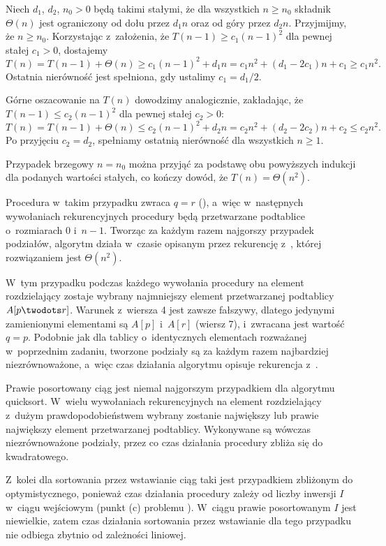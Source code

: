
\exercise %
Niech $d_1$, $d_2$, $n_0>0$ będą takimi stałymi, że dla wszystkich $n\ge n_0$ składnik $\Theta(n)$ jest ograniczony od dołu przez $d_1n$ oraz od góry przez $d_2n$.
Przyjmijmy, że $n\ge n_0$.
Korzystając z~założenia, że $T(n-1)\ge c_1(n-1)^2$ dla pewnej stałej $c_1>0$, dostajemy
\[
	T(n) = T(n-1)+\Theta(n) \ge c_1(n-1)^2+d_1n = c_1n^2+(d_1-2c_1)n+c_1 \ge c_1n^2.
\]
Ostatnia nierówność jest spełniona, gdy ustalimy $c_1=d_1/2$.

Górne oszacowanie na $T(n)$ dowodzimy analogicznie, zakładając, że $T(n-1)\le c_2(n-1)^2$ dla pewnej stałej $c_2>0$:
\[
	T(n) = T(n-1)+\Theta(n) \le c_2(n-1)^2+d_2n = c_2n^2+(d_2-2c_2)n+c_2 \le c_2n^2.
\]
Po przyjęciu $c_2=d_2$, spełniamy ostatnią nierówność dla wszystkich $n\ge1$.

Przypadek brzegowy $n=n_0$ można przyjąć za podstawę obu powyższych indukcji dla podanych wartości stałych, co kończy dowód, że $T(n)=\Theta(n^2)$.

\exercise %
Procedura  w~takim przypadku zwraca $q=r$ (), a~więc w~następnych wywołaniach rekurencyjnych procedury  będą przetwarzane podtablice o~rozmiarach 0 i~$n-1$.
Tworząc za każdym razem najgorszy przypadek podziałów, algorytm działa w~czasie opisanym przez rekurencję z~, której rozwiązaniem jest $\Theta(n^2)$.

\exercise %
W~tym przypadku podczas każdego wywołania procedury  na element rozdzielający zostaje wybrany najmniejszy element przetwarzanej podtablicy $A[p\twodots r]$.
Warunek z~wiersza 4 jest zawsze fałszywy, dlatego jedynymi zamienionymi elementami są $A[p]$ i~$A[r]$ (wiersz 7), i~zwracana jest wartość $q=p$.
Podobnie jak dla tablicy o~identycznych elementach rozważanej w~poprzednim zadaniu, tworzone podziały są za każdym razem najbardziej niezrównoważone, a~więc czas działania algorytmu opisuje rekurencja z~.

\exercise %
Prawie posortowany ciąg jest niemal najgorszym przypadkiem dla algorytmu quicksort.
W~wielu wywołaniach rekurencyjnych na element rozdzielający z~dużym prawdopodobieństwem wybrany zostanie największy lub prawie największy element przetwarzanej podtablicy.
Wykonywane są wówczas niezrównoważone podziały, przez co czas działania procedury  zbliża się do kwadratowego.

Z~kolei dla sortowania przez wstawianie ciąg taki jest przypadkiem zbliżonym do optymistycznego, ponieważ czas działania procedury  zależy od liczby inwersji $I$ w~ciągu wejściowym (punkt (c) problemu ).
W~ciągu prawie posortowanym $I$ jest niewielkie, zatem czas działania sortowania przez wstawianie dla tego przypadku nie odbiega zbytnio od zależności liniowej.


